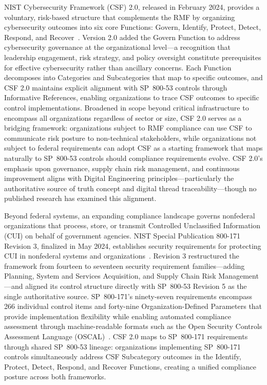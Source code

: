 NIST Cybersecurity Framework (CSF) 2.0, released in February 2024, provides a voluntary, risk-based structure that complements the RMF by organizing cybersecurity outcomes into six core Functions: Govern, Identify, Protect, Detect, Respond, and Recover~\parencite{NIST_CSF_2_0_2024}. Version 2.0 added the Govern Function to address cybersecurity governance at the organizational level---a recognition that leadership engagement, risk strategy, and policy oversight constitute prerequisites for effective cybersecurity rather than ancillary concerns. Each Function decomposes into Categories and Subcategories that map to specific outcomes, and CSF 2.0 maintains explicit alignment with SP~800-53 controls through Informative References, enabling organizations to trace CSF outcomes to specific control implementations. Broadened in scope beyond critical infrastructure to encompass all organizations regardless of sector or size, CSF 2.0 serves as a bridging framework: organizations subject to RMF compliance can use CSF to communicate risk posture to non-technical stakeholders, while organizations not subject to federal requirements can adopt CSF as a starting framework that maps naturally to SP~800-53 controls should compliance requirements evolve. CSF 2.0's emphasis upon governance, supply chain risk management, and continuous improvement aligns with Digital Engineering principles---particularly the authoritative source of truth concept and digital thread traceability---though no published research has examined this alignment.

Beyond federal systems, an expanding compliance landscape governs nonfederal organizations that process, store, or transmit Controlled Unclassified Information (CUI) on behalf of government agencies. NIST Special Publication 800-171 Revision 3, finalized in May 2024, establishes security requirements for protecting CUI in nonfederal systems and organizations~\parencite{NIST_SP_800_171_R3_2024}. Revision 3 restructured the framework from fourteen to seventeen security requirement families---adding Planning, System and Services Acquisition, and Supply Chain Risk Management---and aligned its control structure directly with SP~800-53 Revision 5 as the single authoritative source. SP~800-171's ninety-seven requirements encompass 266 individual control items and forty-nine Organization-Defined Parameters that provide implementation flexibility while enabling automated compliance assessment through machine-readable formats such as the Open Security Controls Assessment Language (OSCAL)~\parencite{NIST_OSCAL_2023}. CSF 2.0 maps to SP~800-171 requirements through shared SP~800-53 lineage: organizations implementing SP~800-171 controls simultaneously address CSF Subcategory outcomes in the Identify, Protect, Detect, Respond, and Recover Functions, creating a unified compliance posture across both frameworks.

